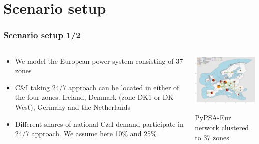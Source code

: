 \section{Scenario setup}


\begin{frame}
  \frametitle{Scenario setup 1/2}

\begin{columns}[T]
\begin{column}{6cm}

  \begin{itemize}

  \item We model the European power system consisting of \alert{37 zones}
  \item C\&I taking 24/7 approach can be located in either of the \alert{four zones}: Ireland, Denmark (zone DK1 or DK-West), Germany and the Netherlands
  \item Different shares of national C\&I demand participate in 24/7 approach. We assume here \alert{10\%} and \alert{25\%}
  \end{itemize}

\end{column}

\begin{column}{8cm}

\centering
\includegraphics[width=8cm]{images/elec_s_37.png}

\vspace{0.1cm}
PyPSA-Eur network clustered to 37 zones

\end{column}
\end{columns}

\end{frame}



